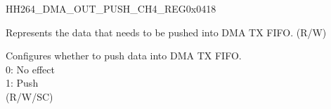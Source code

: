     
    \begin{register}{H}{H264\_DMA\_OUT\_PUSH\_CH4\_REG}{0x0418}\label{regdesc:H264DMAOUTPUSHCH4REG}
    \regnewline%
    \begin{regdesc}\begin{reglist}
    \label{fielddesc:H264DMAOUTFIFOWDATACH4}\item [H264\_DMA\_OUTFIFO\_WDATA\_CH4] Represents the data that needs to be pushed into DMA TX FIFO. (R/W)
    \label{fielddesc:H264DMAOUTFIFOPUSHCH4}\item [H264\_DMA\_OUTFIFO\_PUSH\_CH4] Configures whether to push data into DMA TX FIFO.\\
    0: No effect\\
    1: Push \\(R/W/SC)
    \end{reglist}\end{regdesc}
    \end{register}
    
